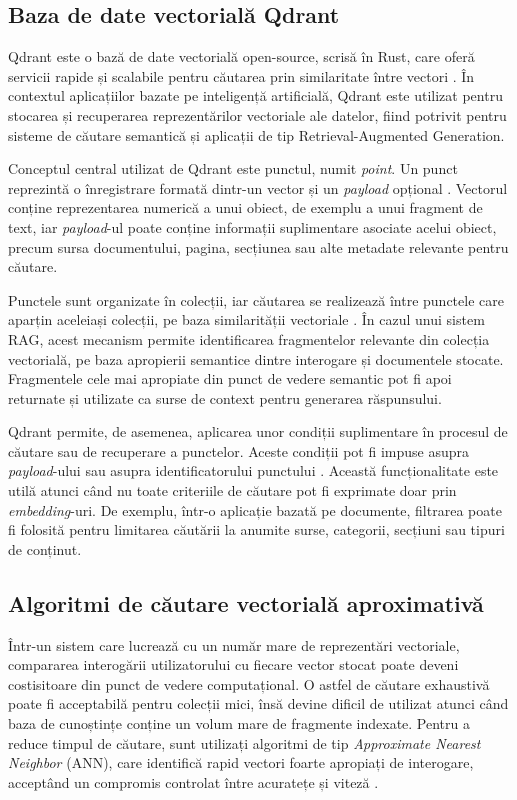 \documentclass[12pt, a4paper, oneside, romanian]{teza-upb}
\begin{document}
\subsection{Baza de date vectorială Qdrant}
Qdrant este o bază de date vectorială open-source, scrisă în Rust, care oferă servicii rapide și scalabile pentru căutarea prin similaritate între vectori \cite{qdrant_doc}. În contextul aplicațiilor bazate pe inteligență artificială, Qdrant este utilizat pentru stocarea și recuperarea reprezentărilor vectoriale ale datelor, fiind potrivit pentru sisteme de căutare semantică și aplicații de tip Retrieval-Augmented Generation.

Conceptul central utilizat de Qdrant este punctul, numit \textit{point}. Un punct reprezintă o înregistrare formată dintr-un vector și un \textit{payload} opțional \cite{qdrant_points}. Vectorul conține reprezentarea numerică a unui obiect, de exemplu a unui fragment de text, iar \textit{payload}-ul poate conține informații suplimentare asociate acelui obiect, precum sursa documentului, pagina, secțiunea sau alte metadate relevante pentru căutare.

Punctele sunt organizate în colecții, iar căutarea se realizează între punctele care aparțin aceleiași colecții, pe baza similarității vectoriale \cite{qdrant_points}. În cazul unui sistem RAG, acest mecanism permite identificarea fragmentelor relevante din colecția vectorială, pe baza apropierii semantice dintre interogare și documentele stocate. Fragmentele cele mai apropiate din punct de vedere semantic pot fi apoi returnate și utilizate ca surse de context pentru generarea răspunsului.

Qdrant permite, de asemenea, aplicarea unor condiții suplimentare în procesul de căutare sau de recuperare a punctelor. Aceste condiții pot fi impuse asupra \textit{payload}-ului sau asupra identificatorului punctului \cite{qdrant_filtering}. Această funcționalitate este utilă atunci când nu toate criteriile de căutare pot fi exprimate doar prin \textit{embedding}-uri. De exemplu, într-o aplicație bazată pe documente, filtrarea poate fi folosită pentru limitarea căutării la anumite surse, categorii, secțiuni sau tipuri de conținut.



\subsection{Algoritmi de căutare vectorială aproximativă}

Într-un sistem care lucrează cu un număr mare de reprezentări vectoriale, compararea interogării utilizatorului cu fiecare vector stocat poate deveni costisitoare din punct de vedere computațional. O astfel de căutare exhaustivă poate fi acceptabilă pentru colecții mici, însă devine dificil de utilizat atunci când baza de cunoștințe conține un volum mare de fragmente indexate. Pentru a reduce timpul de căutare, sunt utilizați algoritmi de tip \textit{Approximate Nearest Neighbor} (ANN), care identifică rapid vectori foarte apropiați de interogare, acceptând un compromis controlat între acuratețe și viteză \cite{malkov2018hnsw}.
\end{document}

